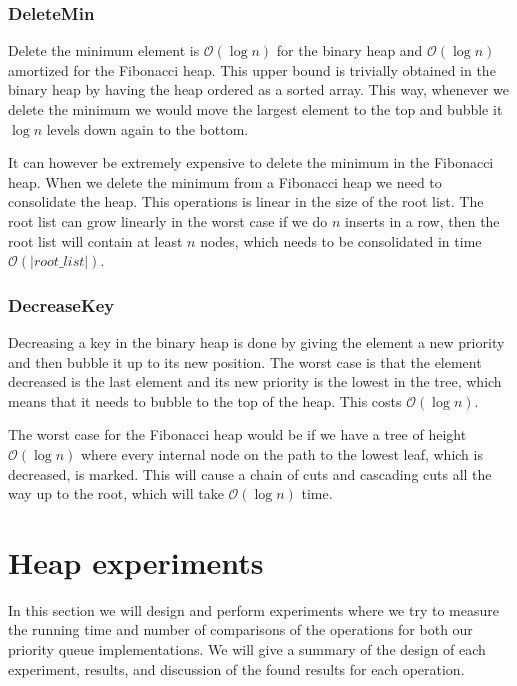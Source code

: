\documentclass[a4paper,oneside,article,11pt]{memoir}
\begin{document}
\subsection{DeleteMin}
Delete the minimum element is $\mathcal{O}(\log{n})$ for the binary heap and $\mathcal{O}(\log{n})$ amortized for the Fibonacci heap. This upper bound is trivially obtained in the binary heap by having the heap ordered as a sorted array. This way, whenever we delete the minimum we would move the largest element to the top and bubble it $\log n$ levels down again to the bottom.

It can however be extremely expensive to delete the minimum in the Fibonacci heap. When we delete the minimum from a Fibonacci heap we need to consolidate the heap. This operations is linear in the size of the root list. The root list can grow linearly in the worst case if we do $n$ inserts in a row, then the root list will contain at least $n$ nodes, which needs to be consolidated in time $\mathcal{O}(\vert root\_list \vert)$.

\subsection{DecreaseKey}
Decreasing a key in the binary heap is done by giving the element a new priority and then bubble it up to its new position. The worst case is that the element decreased is the last element and its new priority is the lowest in the tree, which means that it needs to bubble to the top of the heap. This costs $\mathcal{O}(\log n)$.

The worst case for the Fibonacci heap would be if we have a tree of height $\mathcal{O}(\log n)$ where every internal node on the path to the lowest leaf, which is decreased, is marked. This will cause a chain of cuts and cascading cuts all the way up to the root, which will take $\mathcal{O}(\log n)$ time.

\chapter{Heap experiments}
In this section we will design and perform experiments where we try to measure the running time and number of comparisons of the operations for both our priority queue implementations. We will give a summary of the design of each experiment, results, and discussion of the found results for each operation.
\end{document}
